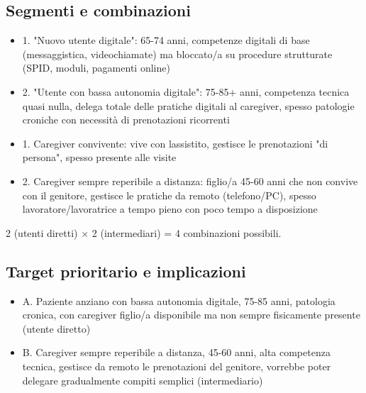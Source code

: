 \subsection{Segmenti e combinazioni}


\begin{itemize}
\item
  1. "Nuovo utente digitale": 65-74 anni, competenze digitali di base
  (messaggistica, videochiamate) ma bloccato/a su procedure strutturate
  (SPID, moduli, pagamenti online)
\item
  2. "Utente con bassa autonomia digitale": 75-85+ anni, competenza tecnica quasi nulla,
  delega totale delle pratiche digitali al caregiver, spesso patologie
  croniche con necessità di prenotazioni ricorrenti
\end{itemize}


\begin{itemize}
\item
  1. Caregiver convivente: vive con l\textquotesingle assistito,
  gestisce le prenotazioni "di persona", spesso presente alle visite
\item
  2. Caregiver sempre reperibile a distanza: figlio/a 45-60 anni che non
  convive con il genitore, gestisce le pratiche da remoto (telefono/PC),
  spesso lavoratore/lavoratrice a tempo pieno con poco tempo a
  disposizione
\end{itemize}


2 (utenti diretti) × 2 (intermediari) = 4 combinazioni possibili.

\subsection{Target prioritario e implicazioni}


\begin{itemize}
\item
  A. Paziente anziano con bassa autonomia digitale, 75-85 anni, patologia cronica,
  con caregiver figlio/a disponibile ma non sempre fisicamente presente
  (utente diretto)
\item
  B. Caregiver sempre reperibile a distanza, 45-60 anni, alta competenza
  tecnica, gestisce da remoto le prenotazioni del genitore, vorrebbe
  poter delegare gradualmente compiti semplici (intermediario)
\end{itemize}

